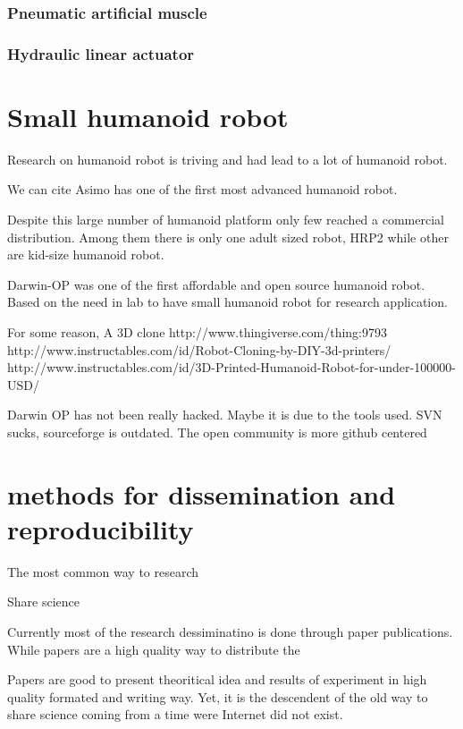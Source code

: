 \subsubsection{Pneumatic artificial muscle} %

\subsubsection{Hydraulic linear actuator} %


\section{Small humanoid robot} %
Research on humanoid robot is triving and had lead to a lot of humanoid robot.

We can cite Asimo has one of the first most advanced humanoid robot.

Despite this large number of humanoid platform only few reached a commercial distribution.
Among them there is only one adult sized robot, HRP2 while other are kid-size humanoid robot.

Darwin-OP was one of the first affordable and open source humanoid robot.
Based on the need in lab to have small  humanoid robot for research application.

For some reason, A 3D clone http://www.thingiverse.com/thing:9793
http://www.instructables.com/id/Robot-Cloning-by-DIY-3d-printers/
http://www.instructables.com/id/3D-Printed-Humanoid-Robot-for-under-100000-USD/

Darwin OP has not been really hacked.
Maybe it is due to the tools used.
SVN sucks, sourceforge is outdated.
The open community is more github centered



\section{methods for dissemination and reproducibility} %

The most common way to  research

Share science

Currently most of the research dessiminatino is done through paper publications.
While papers are a high quality way to distribute the

Papers are good to present theoritical idea and results of experiment in high quality formated and writing way.
Yet, it is the descendent of the old way to share science coming from a time were Internet did not exist.

